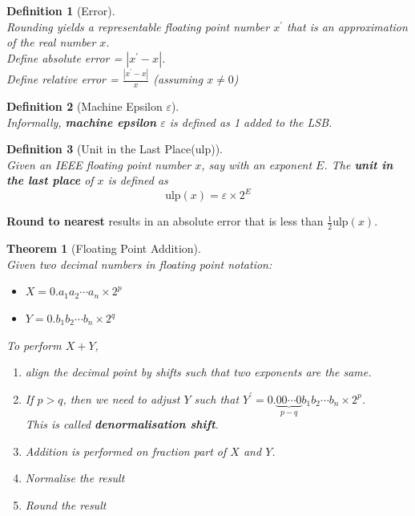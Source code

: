 \documentclass[12pt]{article}
\newtheorem{definition}{Definition}[section]
\newtheorem{theorem}{Theorem}[section]
\theoremstyle{definition}
\begin{document}
\begin{definition}[Error]
\hfill\\\normalfont Rounding yields a representable floating point number $x^\prime$ that is an approximation of the real number $x$.\\
Define absolute error = $|x^\prime -x|$.\\
Define relative error = $\frac{|x^\prime -x|}{x}$ (assuming $x\neq 0$)
\end{definition}
\begin{definition}[Machine Epsilon $\varepsilon$]
\hfill\\\normalfont Informally, \textbf{machine epsilon} $\varepsilon$ is defined as 1\textit{ added to the LSB}.
\end{definition}
\begin{definition}[Unit in the Last Place(ulp)]
\hfill\\\normalfont Given an IEEE floating point number $x$, say with an exponent $E$. The \textbf{unit in the last place} of $x$ is defined as
\[
\text{ulp}(x)=\varepsilon\times 2^E
\]
\end{definition}
\textbf{Round to nearest} results in an absolute error that is less than $\frac{1}{2}\text{ulp}(x)$.
\begin{theorem}[Floating Point Addition]
\hfill\\\normalfont Given two decimal numbers in floating point notation:
\begin{itemize}
  \item $X=0.a_1a_2\cdots a_n\times 2^p$
  \item $Y=0.b_1b_2\cdots b_n\times 2^q$
\end{itemize}
To perform $X+Y$,
\begin{enumerate}
\item align the decimal point by shifts such that two exponents are the same.
\item If $p>q$, then we need to adjust $Y$ such that $Y^\prime = 0.\underbrace{00\cdots 0}_{p-q}b_1b_2\cdots b_n\times 2^p$.\\ This is called \textbf{denormalisation shift}.
\item Addition is performed on fraction part of $X$ and $Y$.
\item Normalise the result
\item Round the result
\end{enumerate}
\end{theorem}
\clearpage
\end{document}
